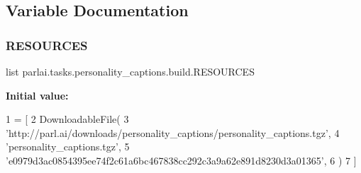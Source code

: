\subsection{Variable Documentation}
\mbox{\label{namespaceparlai_1_1tasks_1_1personality__captions_1_1build_a43edf9dfd08f6790032bd085b1e83af5}} 
\subsubsection{\texorpdfstring{R\+E\+S\+O\+U\+R\+C\+ES}{RESOURCES}}
{\footnotesize\ttfamily list parlai.\+tasks.\+personality\+\_\+captions.\+build.\+R\+E\+S\+O\+U\+R\+C\+ES}

{\bfseries Initial value\+:}
\begin{DoxyCode}
1 =  [
2     DownloadableFile(
3         \textcolor{stringliteral}{'http://parl.ai/downloads/personality\_captions/personality\_captions.tgz'},
4         \textcolor{stringliteral}{'personality\_captions.tgz'},
5         \textcolor{stringliteral}{'e0979d3ac0854395ee74f2c61a6bc467838cc292c3a9a62e891d8230d3a01365'},
6     )
7 ]
\end{DoxyCode}
